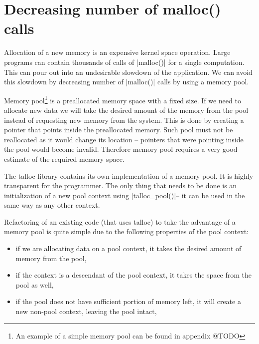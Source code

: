 \section{Decreasing number of malloc() calls}
\label{talloc:pool}

Allocation of a new memory is an expensive kernel space operation. Large
programs can contain thousands of calls of |malloc()| for a single computation.
This can pour out into an undesirable slowdown of the application. We can avoid
this slowdown by decreasing number of |malloc()| calls by using a memory pool.

Memory pool\footnote{An example of a simple memory pool can be found in appendix
@TODO} is a preallocated memory space with a fixed size. If we need to allocate
new data we will take the desired amount of the memory from the pool instead of
requesting new memory from the system. This is done by creating a pointer that
points inside the preallocated memory. Such pool must not be reallocated as it
would change its location -- pointers that were pointing inside the pool would
become invalid. Therefore memory pool requires a very good estimate of the
required memory space.

The talloc library contains its own implementation of a memory pool. It is
highly transparent for the programmer. The only thing that needs to be done is
an initialization of a new pool context using |talloc_pool()|\footnotemark --
it can be used in the same way as any other context.


Refactoring of an existing code (that uses talloc) to take the advantage of a
memory pool is quite simple due to the following properties of the pool context:

\begin{itemize}
  \item if we are allocating data on a pool context, it takes the desired
  amount of memory from the pool,
  \item if the context is a descendant of the pool context, it takes the space
  from the pool as well,
  \item if the pool does not have sufficient portion of memory left, it will
  create a new non-pool context, leaving the pool intact,
\end{itemize}

